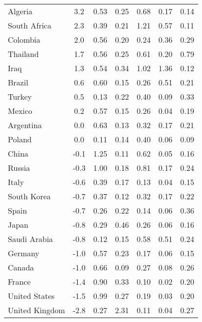 \begin{tabular}[t]{lcccccc}
Algeria & 3.2 & 0.53 & 0.25 & 0.68 & 0.17 & 0.14\\
South Africa & 2.3 & 0.39 & 0.21 & 1.21 & 0.57 & 0.11\\
Colombia & 2.0 & 0.56 & 0.20 & 0.24 & 0.36 & 0.29\\
Thailand & 1.7 & 0.56 & 0.25 & 0.61 & 0.20 & 0.79\\
Iraq & 1.3 & 0.54 & 0.34 & 1.02 & 1.36 & 0.12\\
Brazil & 0.6 & 0.60 & 0.15 & 0.26 & 0.51 & 0.21\\
Turkey & 0.5 & 0.13 & 0.22 & 0.40 & 0.09 & 0.33\\
Mexico & 0.2 & 0.57 & 0.15 & 0.26 & 0.04 & 0.19\\
Argentina & 0.0 & 0.63 & 0.13 & 0.32 & 0.17 & 0.21\\
Poland & 0.0 & 0.11 & 0.14 & 0.40 & 0.06 & 0.09\\
China & -0.1 & 1.25 & 0.11 & 0.62 & 0.05 & 0.16\\
Russia & -0.3 & 1.00 & 0.18 & 0.81 & 0.17 & 0.24\\
Italy & -0.6 & 0.39 & 0.17 & 0.13 & 0.04 & 0.15\\
South Korea & -0.7 & 0.37 & 0.12 & 0.32 & 0.17 & 0.22\\
Spain & -0.7 & 0.26 & 0.22 & 0.14 & 0.06 & 0.36\\
Japan & -0.8 & 0.29 & 0.46 & 0.26 & 0.06 & 0.16\\
Saudi Arabia & -0.8 & 0.12 & 0.15 & 0.58 & 0.51 & 0.24\\
Germany & -1.0 & 0.57 & 0.23 & 0.17 & 0.06 & 0.15\\
Canada & -1.0 & 0.66 & 0.09 & 0.27 & 0.08 & 0.26\\
France & -1.4 & 0.90 & 0.33 & 0.10 & 0.02 & 0.20\\
United States & -1.5 & 0.99 & 0.27 & 0.19 & 0.03 & 0.20\\
United Kingdom & -2.8 & 0.27 & 2.31 & 0.11 & 0.04 & 0.27\\
\bottomrule
\end{tabular}